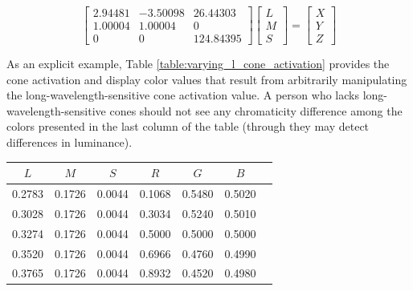 \documentclass{article}
\newenvironment{halffigure}
    {\par\medskip\noindent\minipage{\linewidth}}
    {\endminipage\par\medskip}
\begin{document}
\begin{multicols}{2}
\begin{equation} %
    \begin{bmatrix}
        2.94481&-3.50098&26.44303\\
        1.00004&1.00004&0\\
        0&0&124.84395
    \end{bmatrix}\begin{bmatrix}
        L\\
        M\\
        S
    \end{bmatrix}=\begin{bmatrix}
        X\\
        Y\\
        Z
    \end{bmatrix}
\end{equation}

As an explicit example, Table \ref{table:varying_l_cone_activation} provides the cone activation and display color values that result from arbitrarily manipulating the long-wavelength-sensitive cone activation value.  A person who lacks long-wavelength-sensitive cones should not see any chromaticity difference among the colors presented in the last column of the table (through they may detect differences in luminance).

\begin{halffigure} %
    \begin{tabular}{c|c|c|c|c|c|c}
        $L$ & $M$ & $S$ & $R$ & $G$ & $B$\\
        \hline
        0.2783 & 0.1726 & 0.0044 & 0.1068 & 0.5480 & 0.5020 & \cellcolor{l1}\\
        0.3028 & 0.1726 & 0.0044 & 0.3034 & 0.5240 & 0.5010 & \cellcolor{l2}\\
        0.3274 & 0.1726 & 0.0044 & 0.5000 & 0.5000 & 0.5000 & \cellcolor{l3}\\
        0.3520 & 0.1726 & 0.0044 & 0.6966 & 0.4760 & 0.4990 & \cellcolor{l4}\\
        0.3765 & 0.1726 & 0.0044 & 0.8932 & 0.4520 & 0.4980 & \cellcolor{l5}
    \end{tabular}
    \label{table:varying_l_cone_activation}
\end{halffigure}


\end{multicols}
\end{document}
